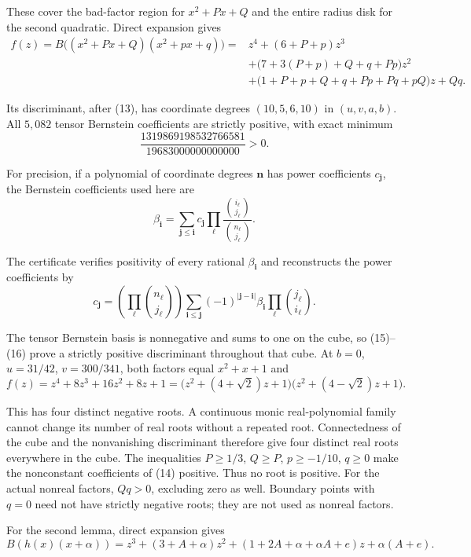\documentclass[
  11pt,
  a4paper,
]{article}
\begin{document}
These cover the bad-factor region for \(x^2+Px+Q\) and the entire radius
disk for the second quadratic. Direct expansion gives
\nopagebreak
\[
\begin{aligned}
f(z)=B\bigl((x^2+Px+Q)(x^2+px+q)\bigr)
={}&z^4+(6+P+p)z^3\\
&+\bigl(7+3(P+p)+Q+q+Pp\bigr)z^2\\
&+\bigl(1+P+p+Q+q+Pp+Pq+pQ\bigr)z+Qq.
\end{aligned}\tag{14}
\]

Its discriminant, after (13), has coordinate degrees \((10,5,6,10)\) in
\((u,v,a,b)\). All \(5,082\) tensor Bernstein coefficients are strictly
positive, with exact minimum
\nopagebreak
\[
\frac{1319869198532766581}{19683000000000000}>0.\tag{15}
\]

For precision, if a polynomial of coordinate degrees \(\mathbf n\) has
power coefficients \(c_{\mathbf j}\), the Bernstein coefficients used
here are
\nopagebreak
\[
\beta_{\mathbf i}=\sum_{\mathbf j\leq\mathbf i}
c_{\mathbf j}\prod_\ell
\frac{\binom{i_\ell}{j_\ell}}{\binom{n_\ell}{j_\ell}}.
\]

The certificate verifies positivity of every rational
\(\beta_{\mathbf i}\) and reconstructs the power coefficients by
\nopagebreak
\[
c_{\mathbf j}=
\left(\prod_\ell\binom{n_\ell}{j_\ell}\right)
\sum_{\mathbf i\leq\mathbf j}(-1)^{|\mathbf j-\mathbf i|}
\beta_{\mathbf i}\prod_\ell\binom{j_\ell}{i_\ell}.\tag{16}
\]

The tensor Bernstein basis is nonnegative and sums to one on the cube,
so (15)--(16) prove a strictly positive discriminant throughout that
cube. At \(b=0\), \(u=31/42\), \(v=300/341\), both factors equal
\(x^2+x+1\) and
\nopagebreak
\[
f(z)=z^4+8z^3+16z^2+8z+1
=\bigl(z^2+(4+\sqrt2)z+1\bigr)
 \bigl(z^2+(4-\sqrt2)z+1\bigr).
\]

This has four distinct negative roots. A continuous monic
real-polynomial family cannot change its number of real roots without a
repeated root. Connectedness of the cube and the nonvanishing
discriminant therefore give four distinct real roots everywhere in the
cube. The inequalities \(P\geq1/3\), \(Q\geq P\), \(p\geq-1/10\),
\(q\geq0\) make the nonconstant coefficients of (14) positive. Thus no
root is positive. For the actual nonreal factors, \(Qq>0\), excluding
zero as well. Boundary points with \(q=0\) need not have strictly
negative roots; they are not used as nonreal factors.

For the second lemma, direct expansion gives
\nopagebreak
\[
B(h(x)(x+\alpha))
=z^3+(3+A+\alpha)z^2
+(1+2A+\alpha+\alpha A+e)z+\alpha(A+e).\tag{17}
\]
\end{document}
